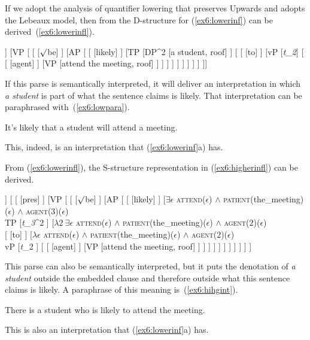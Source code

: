 \medskip
If we adopt the analysis of quantifier lowering that preserves Upwards and adopts the Lebeaux model, then from the D-structure for (\ref{ex6:lowerinf}) can be derived~(\ref{ex6:lowerinfl}).
\begin{exe}
\raggedright
	\ex \label{ex6:lowerinfl}
	\footnotesize
	\begin{forest}
		[TP[\ibar{T}
			[\obar{T} [pres] ]
			[VP [
				[ ]
				[AP [
					[ [likely] ]
					[TP 
					[DP^2 [a student, roof] ]			
					[
						[ [to] ]
						[vP
							[{\emph{t_2}}]
							[
								[ [agent] ]
								[VP [attend the meeting, roof] ]
							 ]
						 ]
					] ]
				] ]
			] ]
		]]
		\end{forest}
\end{exe}
If this parse is semantically interpreted, it will deliver an interpretation in which \emph{a student} is part of what the sentence claims is likely. That interpretation can be paraphrased with~(\ref{ex6:lowpara}).
\begin{exe}
\raggedright
	\ex \label{ex6:lowpara}
	It's likely that a student will attend a meeting.
\end{exe}
This, indeed, is an interpretation that (\ref{ex6:lowerinf}a) has.

From (\ref{ex6:lowerinfl}), the S-structure representation in (\ref{ex6:higherinfl}) can be derived.
\medskip
\begin{fullwidth}
\begin{exe}
\raggedright
	\ex \label{ex6:higherinfl}
	\footnotesize
	\begin{forest}
	[TP
		[DP^3 [a student, roof] ]
		[
			[ [pres] ]
			[VP [
				[ ]
				[AP [
					[ [likely] ]
					[$\exists \epsilon$ \textsc{attend}($\epsilon$) $\wedge$ \textsc{patient}(the\_meeting)($\epsilon$) $\wedge$ \textsc{agent}($3$)($\epsilon$)\\TP
						[\emph{t_3}^2 ]
						[$\lambda 2\ \exists \epsilon$ \textsc{attend}($\epsilon$) $\wedge$ \textsc{patient}(the\_meeting)($\epsilon$) $\wedge$ \textsc{agent}($2$)($\epsilon$)\\
							[ [to] ]
							[$\lambda \epsilon$ \textsc{attend}($\epsilon$) $\wedge$ \textsc{patient}(the\_meeting)($\epsilon$) $\wedge$ \textsc{agent}($2$)($\epsilon$)\\vP
								[\emph{t}_2 ]
								[
									[ [agent] ]
									[VP [attend the meeting, roof] ]
								 ]
							 ]
						 ]
					 ]
				] ]
			] ]
		 ]
	]
	\end{forest}
\end{exe}	
\end{fullwidth}
\medskip
This parse can also be semantically interpreted, but it puts the denotation of \emph{a student} outside the embedded clause and therefore outside what this sentence claims is likely. A paraphrase of this meaning is~(\ref{ex6:hihgint}).
\begin{exe}
\raggedright
	\ex \label{ex6:hihgint}
	There is a student who is likely to attend the meeting.
\end{exe}
This is also an interpretation that (\ref{ex6:lowerinf}a) has. 

